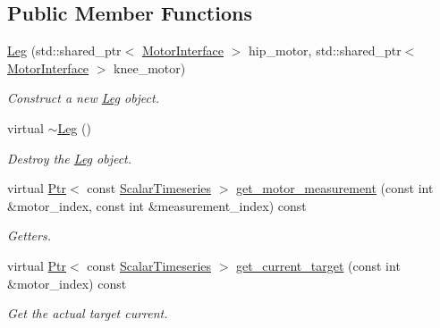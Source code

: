 \subsection*{Public Member Functions}
\begin{DoxyCompactItemize}
\item 
\hyperlink{classblmc__drivers_1_1Leg_aaa53f0583fcfd7f4e8aa32889aaa2f85}{Leg} (std\+::shared\+\_\+ptr$<$ \hyperlink{classblmc__drivers_1_1MotorInterface}{Motor\+Interface} $>$ hip\+\_\+motor, std\+::shared\+\_\+ptr$<$ \hyperlink{classblmc__drivers_1_1MotorInterface}{Motor\+Interface} $>$ knee\+\_\+motor)
\begin{DoxyCompactList}\small\item\em Construct a new \hyperlink{classblmc__drivers_1_1Leg}{Leg} object. \end{DoxyCompactList}\item 
\mbox{\label{classblmc__drivers_1_1Leg_add76148d01d09ecb505bb23ce34d45c8}} 
virtual \hyperlink{classblmc__drivers_1_1Leg_add76148d01d09ecb505bb23ce34d45c8}{$\sim$\+Leg} ()
\begin{DoxyCompactList}\small\item\em Destroy the \hyperlink{classblmc__drivers_1_1Leg}{Leg} object. \end{DoxyCompactList}\item 
virtual \hyperlink{classblmc__drivers_1_1LegInterface_ac5af9e6514abff5ee918813925a8e42d}{Ptr}$<$ const \hyperlink{classblmc__drivers_1_1LegInterface_a57a35b64a76fb4225637828d1b1c35a6}{Scalar\+Timeseries} $>$ \hyperlink{classblmc__drivers_1_1Leg_a52fe5c7cc7ad0242a481d969f5b2ff54}{get\+\_\+motor\+\_\+measurement} (const int \&motor\+\_\+index, const int \&measurement\+\_\+index) const
\begin{DoxyCompactList}\small\item\em Getters. \end{DoxyCompactList}\item 
virtual \hyperlink{classblmc__drivers_1_1LegInterface_ac5af9e6514abff5ee918813925a8e42d}{Ptr}$<$ const \hyperlink{classblmc__drivers_1_1LegInterface_a57a35b64a76fb4225637828d1b1c35a6}{Scalar\+Timeseries} $>$ \hyperlink{classblmc__drivers_1_1Leg_aeeb8a84e6dd1f1809d220ee1da8d3007}{get\+\_\+current\+\_\+target} (const int \&motor\+\_\+index) const
\begin{DoxyCompactList}\small\item\em Get the actual target current. \end{DoxyCompactList}\item 

\end{DoxyCompactItemize}
